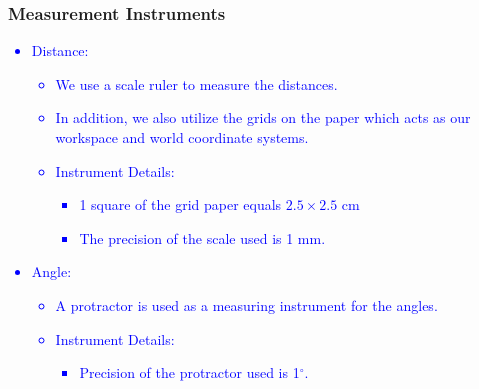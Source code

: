 \documentclass[10pt,a4paper]{article}
\begin{document}
		\subsubsection{Measurement Instruments}\textcolor{blue}{
			\begin{itemize}
				\item Distance:
				\begin{itemize}
					\item We use a scale ruler to measure the distances.
					\item In addition, we also utilize the grids on the paper which acts as our workspace and world coordinate systems.
					\item Instrument Details:
					\begin{itemize}
						\item 1 square of the grid paper equals $2.5 \times 2.5$ cm
						\item The precision of the scale used is 1 mm.
					\end{itemize}
				\end{itemize}
				\item Angle:
				\begin{itemize}
					\item A protractor is used as a measuring instrument for the angles.
					\item Instrument Details:
					\begin{itemize}
						\item Precision of the protractor used is 1$^\circ$.
					\end{itemize}
				\end{itemize}
			\end{itemize}
		}
\end{document}

